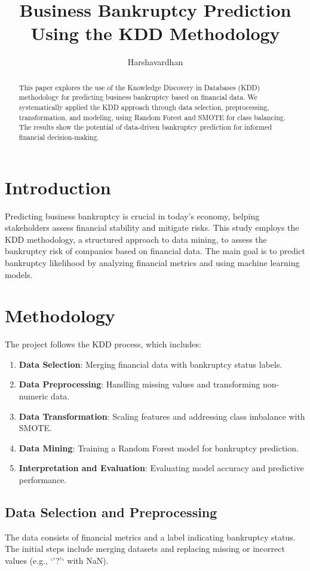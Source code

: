 \documentclass{article}
\title{Business Bankruptcy Prediction Using the KDD Methodology}
\author{Harshavardhan}
\begin{document}
\maketitle

\begin{abstract}
This paper explores the use of the Knowledge Discovery in Databases (KDD) methodology for predicting business bankruptcy based on financial data. We systematically applied the KDD approach through data selection, preprocessing, transformation, and modeling, using Random Forest and SMOTE for class balancing. The results show the potential of data-driven bankruptcy prediction for informed financial decision-making.
\end{abstract}

\section{Introduction}
Predicting business bankruptcy is crucial in today's economy, helping stakeholders assess financial stability and mitigate risks. This study employs the KDD methodology, a structured approach to data mining, to assess the bankruptcy risk of companies based on financial data. The main goal is to predict bankruptcy likelihood by analyzing financial metrics and using machine learning models.

\section{Methodology}

The project follows the KDD process, which includes:
\begin{enumerate}
    \item \textbf{Data Selection}: Merging financial data with bankruptcy status labels.
    \item \textbf{Data Preprocessing}: Handling missing values and transforming non-numeric data.
    \item \textbf{Data Transformation}: Scaling features and addressing class imbalance with SMOTE.
    \item \textbf{Data Mining}: Training a Random Forest model for bankruptcy prediction.
    \item \textbf{Interpretation and Evaluation}: Evaluating model accuracy and predictive performance.
\end{enumerate}

\subsection{Data Selection and Preprocessing}
The data consists of financial metrics and a label indicating bankruptcy status. The initial steps include merging datasets and replacing missing or incorrect values (e.g., `'?'` with NaN). 
\end{document}
